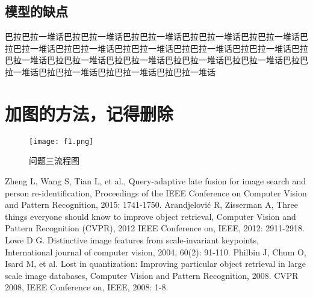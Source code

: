 \documentclass[bwprint]{gmcmthesis}
\begin{document}
\subsection{模型的缺点}
巴拉巴拉一堆话巴拉巴拉一堆话巴拉巴拉一堆话巴拉巴拉一堆话巴拉巴拉一堆话巴拉巴拉一堆话巴拉巴拉一堆话巴拉巴拉一堆话巴拉巴拉一堆话巴拉巴拉一堆话巴拉巴拉一堆话巴拉巴拉一堆话巴拉巴拉一堆话巴拉巴拉一堆话巴拉巴拉一堆话巴拉巴拉一堆话巴拉巴拉一堆话巴拉巴拉一堆话巴拉巴拉一堆话






\section{加图的方法，记得删除}
\begin{figure}[!h]
\centering
\texttt{[image: f1.png]}
\caption{问题三流程图}
\end{figure}




\newpage



\begin{thebibliography}{99}  
Zheng L, Wang S, Tian L, et al., Query-adaptive late fusion for image search and person re-identification, Proceedings of the IEEE Conference on Computer Vision and Pattern Recognition, 2015: 1741-1750.  
Arandjelović R, Zisserman A, Three things everyone should know to improve object retrieval, Computer Vision and Pattern Recognition (CVPR), 2012 IEEE Conference on, IEEE, 2012: 2911-2918.  
Lowe D G. Distinctive image features from scale-invariant keypoints, International journal of computer vision, 2004, 60(2): 91-110.  
Philbin J, Chum O, Isard M, et al. Lost in quantization: Improving particular object retrieval in large scale image databases, Computer Vision and Pattern Recognition, 2008. CVPR 2008, IEEE Conference on, IEEE, 2008: 1-8.  
\end{thebibliography}



% 
% 
\end{document}

